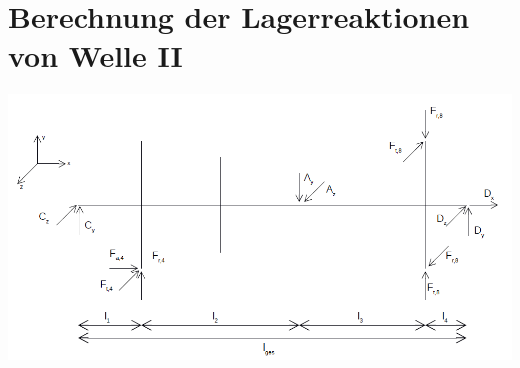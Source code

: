 \section{Berechnung der Lagerreaktionen von Welle II}
\begin{center}
	\includegraphics[width=1.04\textwidth,keepaspectratio]{figures/Uebersicht.png}
\end{center}
